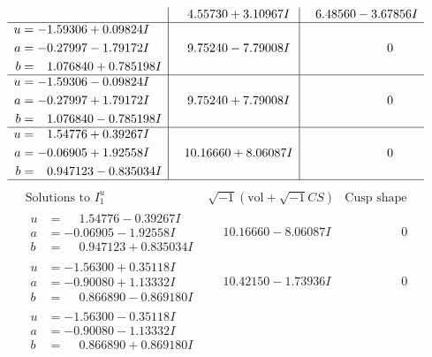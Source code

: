 \documentclass[1p]{elsarticle_modified}
\theoremstyle{definition}
\newcommand{\I}{\sqrt{-1}}
\begin{document}
$$\begin{array}{c|c|c}
 & \phantom{-}4.55730 + 3.10967 I & \phantom{-}6.48560 - 3.67856 I \\ \hline\begin{aligned}
u &= -1.59306 + 0.09824 I \\
a &= -0.27997 - 1.79172 I \\
b &= \phantom{-}1.076840 + 0.785198 I\end{aligned}
 & \phantom{-}9.75240 - 7.79008 I & \phantom{-0.000000 } 0 \\ \hline\begin{aligned}
u &= -1.59306 - 0.09824 I \\
a &= -0.27997 + 1.79172 I \\
b &= \phantom{-}1.076840 - 0.785198 I\end{aligned}
 & \phantom{-}9.75240 + 7.79008 I & \phantom{-0.000000 } 0 \\ \hline\begin{aligned}
u &= \phantom{-}1.54776 + 0.39267 I \\
a &= -0.06905 + 1.92558 I \\
b &= \phantom{-}0.947123 - 0.835034 I\end{aligned}
 & \phantom{-}10.16660 + 8.06087 I & \phantom{-0.000000 } 0\\
 \hline 
 \end{array}$$\newpage$$\begin{array}{c|c|c}  
\text{Solutions to }I^u_{1}& \I (\text{vol} + \sqrt{-1}CS) & \text{Cusp shape}\\
 \hline 
\begin{aligned}
u &= \phantom{-}1.54776 - 0.39267 I \\
a &= -0.06905 - 1.92558 I \\
b &= \phantom{-}0.947123 + 0.835034 I\end{aligned}
 & \phantom{-}10.16660 - 8.06087 I & \phantom{-0.000000 } 0 \\ \hline\begin{aligned}
u &= -1.56300 + 0.35118 I \\
a &= -0.90080 + 1.13332 I \\
b &= \phantom{-}0.866890 - 0.869180 I\end{aligned}
 & \phantom{-}10.42150 - 1.73936 I & \phantom{-0.000000 } 0 \\ \hline\begin{aligned}
u &= -1.56300 - 0.35118 I \\
a &= -0.90080 - 1.13332 I \\
b &= \phantom{-}0.866890 + 0.869180 I\end{aligned}

\end{array}$$
\end{document}
